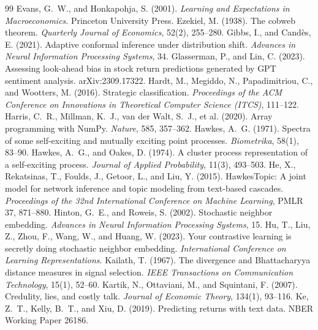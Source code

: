 \documentclass{article}
\theoremstyle{plain}
\theoremstyle{definition}
\theoremstyle{remark}
\begin{document}
{\begin{thebibliography}{99}
 Evans, G.~W., and Honkapohja, S. (2001). \emph{Learning and Expectations in Macroeconomics}. Princeton University Press.
 Ezekiel, M. (1938). The cobweb theorem. \emph{Quarterly Journal of Economics}, 52(2), 255--280.
 Gibbs, I., and Cand\`es, E. (2021). Adaptive conformal inference under distribution shift. \emph{Advances in Neural Information Processing Systems}, 34.
 Glasserman, P., and Lin, C. (2023). Assessing look-ahead bias in stock return predictions generated by GPT sentiment analysis. arXiv:2309.17322.
 Hardt, M., Megiddo, N., Papadimitriou, C., and Wootters, M. (2016). Strategic classification. \emph{Proceedings of the ACM Conference on Innovations in Theoretical Computer Science (ITCS)}, 111--122.
 Harris, C.~R., Millman, K.~J., van der Walt, S.~J., et al. (2020). Array programming with NumPy. \emph{Nature}, 585, 357--362.
 Hawkes, A.~G. (1971). Spectra of some self-exciting and mutually exciting point processes. \emph{Biometrika}, 58(1), 83--90.
 Hawkes, A.~G., and Oakes, D. (1974). A cluster process representation of a self-exciting process. \emph{Journal of Applied Probability}, 11(3), 493--503.
 He, X., Rekatsinas, T., Foulds, J., Getoor, L., and Liu, Y. (2015). HawkesTopic: A joint model for network inference and topic modeling from text-based cascades. \emph{Proceedings of the 32nd International Conference on Machine Learning}, PMLR 37, 871--880.
 Hinton, G.~E., and Roweis, S. (2002). Stochastic neighbor embedding. \emph{Advances in Neural Information Processing Systems}, 15.
 Hu, T., Liu, Z., Zhou, F., Wang, W., and Huang, W. (2023). Your contrastive learning is secretly doing stochastic neighbor embedding. \emph{International Conference on Learning Representations}.
 Kailath, T. (1967). The divergence and Bhattacharyya distance measures in signal selection. \emph{IEEE Transactions on Communication Technology}, 15(1), 52--60.
 Kartik, N., Ottaviani, M., and Squintani, F. (2007). Credulity, lies, and costly talk. \emph{Journal of Economic Theory}, 134(1), 93--116.
 Ke, Z.~T., Kelly, B.~T., and Xiu, D. (2019). Predicting returns with text data. NBER Working Paper 26186.

\end{thebibliography}}
\end{document}
